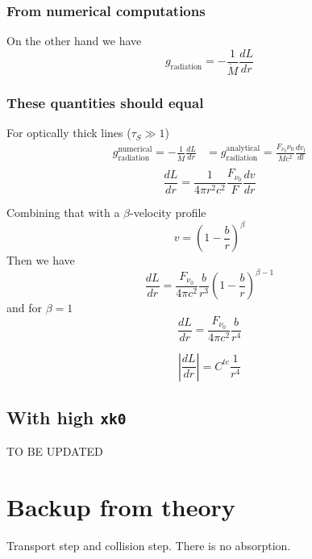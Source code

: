 \documentclass[../main/main.tex]{subfiles}
\begin{document}
\subsubsection{From numerical computations}
On the other hand we have
\begin{equation}
\boxed{g_{\text{radiation}} = - \frac{1}{\dot{M}}\frac{dL}{dr}}
\end{equation}

\subsubsection{These quantities should equal}
For optically thick lines ($\tau_S \gg 1$)
\begin{equation}
\begin{aligned}
g_{\text{radiation}}^{\text{numerical}} = -\frac{1}{\dot{M}} \frac{dL}{dr} &= g_{\text{radiation}}^{\text{analytical}} = \frac{F_{\nu_0} \nu_0 }{\dot{M} c^2} \frac{dv_l}{dl} \\
\end{aligned}
\end{equation}
\begin{equation}
\frac{dL}{dr} = \frac{1}{4 \pi r^2 c^2} \frac{F_{\nu_0}}{F} \frac{dv}{dr}
\end{equation}

Combining that with a $\beta$-velocity profile
\begin{equation}
v = \left( 1 - \frac{b}{r} \right)^{\beta} 
\end{equation}
Then we have 
\begin{equation}
\boxed{\frac{dL}{dr} = \frac{F_{\nu_0}}{4 \pi c^2} \frac{b}{r^3} \left( 1-\frac{b}{r}\right)^{\beta - 1}}
\end{equation}
and for $\beta = 1$
\begin{equation}
\frac{dL}{dr} = \frac{F_{\nu_0}}{4 \pi c^2} \frac{b}{r^4} 
\end{equation}

\begin{equation}
\left| \frac{dL}{dr} \right| = C^{te}\frac{1}{r^4}
\end{equation}

\newpage
\subsection{With high \texttt{xk0}}
TO BE UPDATED


\newpage
\section{Backup from theory}
Transport step and collision step. There is no absorption.
\end{document}

